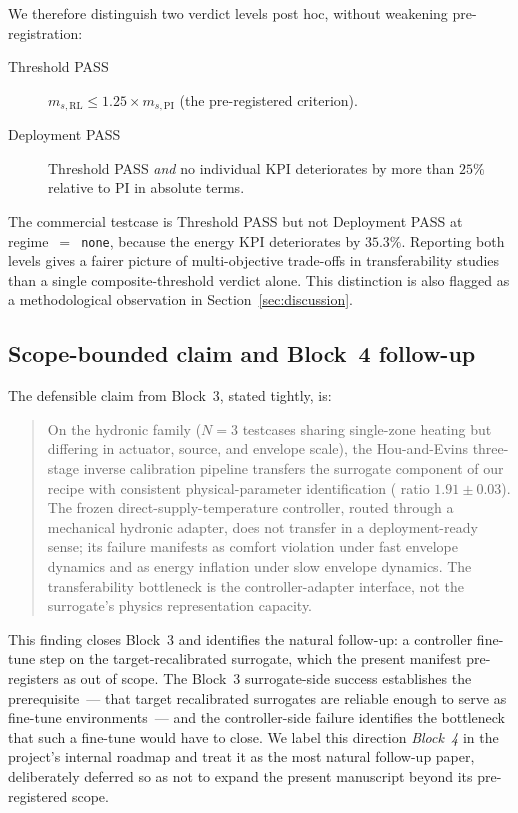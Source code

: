 We therefore distinguish two verdict levels post hoc, without weakening
pre-registration:

\begin{description}
    \item[Threshold PASS] \(m_{s,\mathrm{RL}} \leq 1.25 \times m_{s,\mathrm{PI}}\)
    (the pre-registered criterion).
    \item[Deployment PASS] Threshold PASS \emph{and} no individual KPI
    deteriorates by more than $25\%$ relative to PI in absolute terms.
\end{description}

The commercial testcase is Threshold PASS but not Deployment PASS at
regime~$=$~\texttt{none}, because the energy KPI deteriorates by $35.3\%$.
Reporting both levels gives a fairer picture of multi-objective trade-offs
in transferability studies than a single composite-threshold verdict
alone. This distinction is also flagged as a methodological observation
in Section~\ref{sec:discussion}.

\subsection{Scope-bounded claim and Block~4 follow-up}
\label{ssec:res3_scope_and_followup}

The defensible claim from Block~3, stated tightly, is:

\begin{quote}
On the \boptest{} hydronic family ($N=3$ testcases sharing single-zone
heating but differing in actuator, source, and envelope scale), the
Hou-and-Evins three-stage inverse calibration pipeline transfers the
surrogate component of our recipe with consistent physical-parameter
identification (\czon{} ratio $1.91 \pm 0.03$). The frozen
direct-supply-temperature controller, routed through a mechanical
hydronic adapter, does not transfer in a deployment-ready sense; its
failure manifests as comfort violation under fast envelope dynamics and
as energy inflation under slow envelope dynamics. The transferability
bottleneck is the controller-adapter interface, not the surrogate's
physics representation capacity.
\end{quote}

This finding closes Block~3 and identifies the natural follow-up: a
controller fine-tune step on the target-recalibrated surrogate, which the
present manifest pre-registers as out of scope. The Block~3
surrogate-side success establishes the prerequisite~--- that target
recalibrated surrogates are reliable enough to serve as fine-tune
environments~--- and the controller-side failure identifies the
bottleneck that such a fine-tune would have to close. We label this
direction \emph{Block~4} in the project's internal roadmap and treat it
as the most natural follow-up paper, deliberately deferred so as not to
expand the present manuscript beyond its pre-registered scope.

